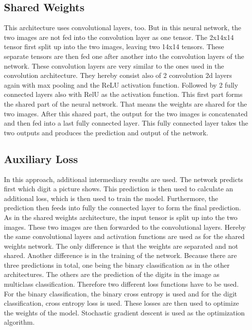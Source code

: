 \documentclass[12pt]{article}
\begin{document}
\subsection{Shared Weights}
This architecture uses convolutional layers, too.
But in this neural network, the two images are not fed into the convolution layer as one tensor.
The 2x14x14 tensor first split up into the two images, leaving two 14x14 tensors.
These separate tensors are then fed one after another into the convolution layers of the network.
These convolution layers are very similar to the ones used in the convolution architecture.
They hereby consist also of 2 convolution 2d layers again with max pooling and the ReLU activation function.
Followed by 2 fully connected layers also with RelU as the activation function.
This first part forms the shared part of the neural network.
That means the weights are shared for the two images.
After this shared part, the output for the two images is concatenated and then fed into a last fully connected layer.
This fully connected layer takes the two outputs and produces the prediction and output of the network.
\subsection{Auxiliary Loss}
In this approach, additional intermediary results are used.
The network predicts first which digit a picture shows.
This prediction is then used to calculate an additional loss, which is then used to train the model.
Furthermore, the prediction then feeds into fully the connected layer to form the final prediction.
As in the shared weights architecture, the input tensor is split up into the two images.
These two images are then forwarded to the convolutional layers.
Hereby the same convolutional layers and activation functions are used as for the shared weights network.
The only difference is that the weights are separated and not shared.
Another difference is in the training of the network.
Because there are three predictions in total, one being the binary classification as in the other architectures.
The others are the prediction of the digits in the image as multiclass classification.
Therefore two different loss functions have to be used.
For the binary classification, the binary cross entropy is used and for the digit classification, cross entropy loss is used.
These losses are then used to optimize the weights of the model.
Stochastic gradient descent is used as the optimization algorithm. 
\end{document}
